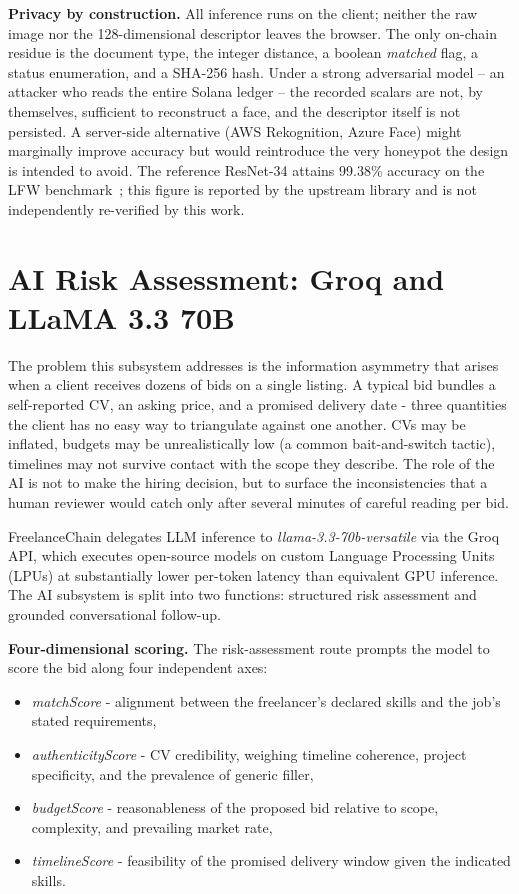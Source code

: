 \textbf{Privacy by construction.} All inference runs on the client; neither the raw image nor the 128-dimensional descriptor leaves the browser. The only on-chain residue is the document type, the integer distance, a boolean \emph{matched} flag, a status enumeration, and a SHA-256 hash. Under a strong adversarial model -- an attacker who reads the entire Solana ledger -- the recorded scalars are not, by themselves, sufficient to reconstruct a face, and the descriptor itself is not persisted. A server-side alternative (AWS Rekognition, Azure Face) might marginally improve accuracy but would reintroduce the very honeypot the design is intended to avoid. The reference ResNet-34 attains 99.38\% accuracy on the LFW benchmark~\cite{vladmandic2021faceapi}; this figure is reported by the upstream library and is not independently re-verified by this work.

\section{AI Risk Assessment: Groq and LLaMA 3.3 70B}
\label{section:3.6}

The problem this subsystem addresses is the information asymmetry that arises when a client receives dozens of bids on a single listing. A typical bid bundles a self-reported CV, an asking price, and a promised delivery date - three quantities the client has no easy way to triangulate against one another. CVs may be inflated, budgets may be unrealistically low (a common bait-and-switch tactic), timelines may not survive contact with the scope they describe. The role of the AI is not to make the hiring decision, but to surface the inconsistencies that a human reviewer would catch only after several minutes of careful reading per bid.

FreelanceChain delegates LLM inference to \emph{llama-3.3-70b-versatile} via the Groq API, which executes open-source models on custom Language Processing Units (LPUs) at substantially lower per-token latency than equivalent GPU inference. The AI subsystem is split into two functions: structured risk assessment and grounded conversational follow-up.

\textbf{Four-dimensional scoring.} The risk-assessment route prompts the model to score the bid along four independent axes:
\begin{itemize}[noitemsep]
    \item \emph{matchScore} - alignment between the freelancer's declared skills and the job's stated requirements,
    \item \emph{authenticityScore} - CV credibility, weighing timeline coherence, project specificity, and the prevalence of generic filler,
    \item \emph{budgetScore} - reasonableness of the proposed bid relative to scope, complexity, and prevailing market rate,
    \item \emph{timelineScore} - feasibility of the promised delivery window given the indicated skills.
\end{itemize}

